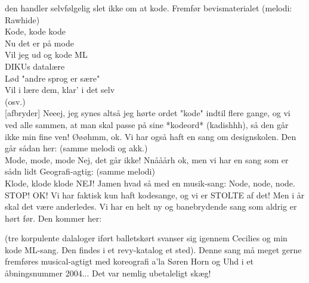 \documentclass[a4paper,11pt]{article}
\begin{document}
\begin{sketch}
         den handler selvfølgelig slet ikke om at kode. Fremfør
         bevismaterialet
 (melodi: Rawhide)\\
         Kode, kode kode\\
         Nu det er på mode\\
         Vil jeg ud og kode ML\\
         DIKUs datalære\\
         Lød "andre sprog er sære"\\
         Vil i lære dem, klar' i det selv\\
         (osv.)\\
[afbryder] Neeej, jeg synes altså jeg hørte ordet "kode"
         indtil flere gange, og vi ved alle sammen, at man skal passe
         på sine *kodeord* (kadishhh), så den går ikke min fine ven!
 Øøøhmm, ok. Vi har også haft en sang om designskolen. Den
         går sådan her:
 (samme melodi og akk.)\\
         Mode, mode, mode
 Nej, det går ikke!
 Nnååårh ok, men vi har en sang som er sådn lidt Geografi-agtig:
 (samme melodi)\\
         Klode, klode klode
 NEJ!
 Jamen hvad så med en musik-sang:
 Node, node, node.
 STOP!
 OK! Vi har faktisk kun haft kodesange, og vi er STOLTE af
         det! Men i år skal det være anderledes. Vi har en helt ny og
         banebrydende sang som aldrig er hørt før. Den kommer her:

         (tre korpulente dalaloger iført balletskørt svanser sig
         igennem Cecilies og min kode ML-sang. Den findes i et
         revy-katalog et sted). Denne sang må meget gerne fremføres
         musical-agtigt med koreografi a'la Søren Horn og Uhd i et
         åbningsnummer 2004... Det var nemlig ubetaleligt skæg!

\end{sketch}
\end{document}
